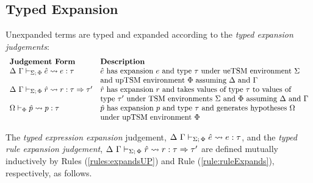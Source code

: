 {{{{\subsection{Typed Expansion}
Unexpanded terms are typed and expanded according to the \emph{typed expansion judgements}:
\[\begin{array}{ll}
\textbf{Judgement Form} & \textbf{Description}\\
\Delta~\Gamma \vdash_{\Sigma;\,\Phi} \hat{e} \leadsto e : \tau & \text{$\hat{e}$ has expansion $e$ and type $\tau$ under ueTSM environment $\Sigma$}\\
& \text{and upTSM environment $\Phi$ assuming $\Delta$ and $\Gamma$}\\
\Delta~\Gamma \vdash_{\Sigma;\,\Phi} \hat{r} \leadsto r : \tau \Rightarrow \tau' & \text{$\hat{r}$ has expansion $r$ and takes values of type $\tau$ to values of}\\
& \text{type $\tau'$ under TSM environments $\Sigma$ and $\Phi$ assuming $\Delta$ and $\Gamma$}\\
\Omega \vdash_{\Phi} \hat{p} \leadsto p : \tau & \text{$\hat{p}$ has expansion $p$ and type $\tau$ and generates hypotheses $\Omega$ }\\
& \text{under upTSM environment $\Phi$}
\end{array}\]

The \emph{typed expression expansion} judgement, $\Delta~\Gamma \vdash_{\Sigma;\,\Phi} \hat{e} \leadsto e : \tau$, and the \emph{typed rule expansion judgement}, $\Delta~\Gamma \vdash_{\Sigma;\,\Phi} \hat{r} \leadsto r : \tau \Rightarrow \tau'$ are defined mutually inductively by Rules (\ref*{rules:expandsUP}) and Rule (\ref*{rule:ruleExpands}), respectively, as follows.

}}}}

